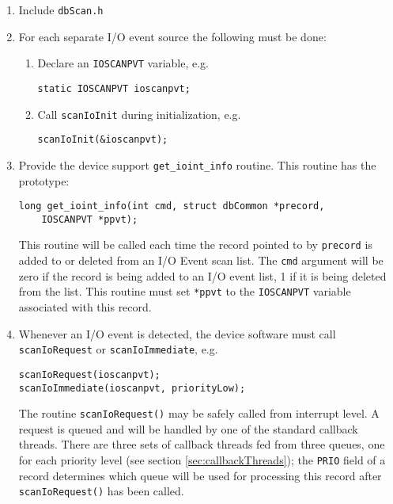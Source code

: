 \begin{enumerate}
\item Include \verb|dbScan.h|

\item For each separate I/O event source the following must be done:

\begin{enumerate}

\item Declare an \verb|IOSCANPVT| variable, e.g.

\begin{verbatim}
static IOSCANPVT ioscanpvt;
\end{verbatim}

\item Call \verb|scanIoInit| during initialization, e.g.

\begin{verbatim}
scanIoInit(&ioscanpvt);
\end{verbatim}
\end{enumerate}

\item Provide the device support \verb|get_ioint_info| routine.
This routine has the prototype:

\begin{verbatim}
long get_ioint_info(int cmd, struct dbCommon *precord,
    IOSCANPVT *ppvt);
\end{verbatim}

This routine will be called each time the record pointed to by \verb|precord| is added to or deleted from an I/O Event scan list.
The \verb|cmd| argument will be zero if the record is being added to an I/O event list, 1 if it is being deleted from the list.
This routine must set \verb|*ppvt| to the \verb|IOSCANPVT| variable associated with this record.

\item Whenever an I/O event is detected, the device software must call \verb|scanIoRequest| or \verb|scanIoImmediate|, e.g.

\begin{verbatim}
scanIoRequest(ioscanpvt);
scanIoImmediate(ioscanpvt, priorityLow);
\end{verbatim}

The routine \verb|scanIoRequest()| may be safely called from interrupt level.
A request is queued and will be handled by one of the standard callback threads.
There are three sets of callback threads fed from three queues, one for each priority level (see section \ref{sec:callbackThreads}); the \verb|PRIO| field of a record determines which queue will be used for processing this record after \verb|scanIoRequest()| has been called.


\end{enumerate}
